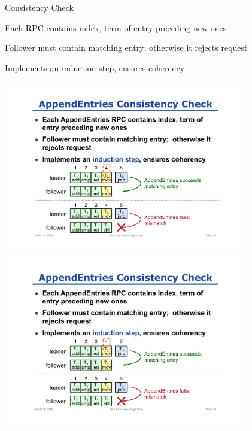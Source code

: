 \begin{frame}{\AppendRPC Consistency Check}
	
\BI
\item Each \AppendRPC RPC contains index, term of entry preceding new ones
\item Follower must contain matching entry;  otherwise it rejects request
\item Implements an \alert{induction} step, ensures coherency
\EI

\smallskip
\begin{center}
\begin{overprint}
\includegraphics[width=0.8\textwidth,page=1]{consistency-check}
\includegraphics[width=0.8\textwidth,page=2]{consistency-check}
\end{overprint}
\end{center}

\end{frame}

